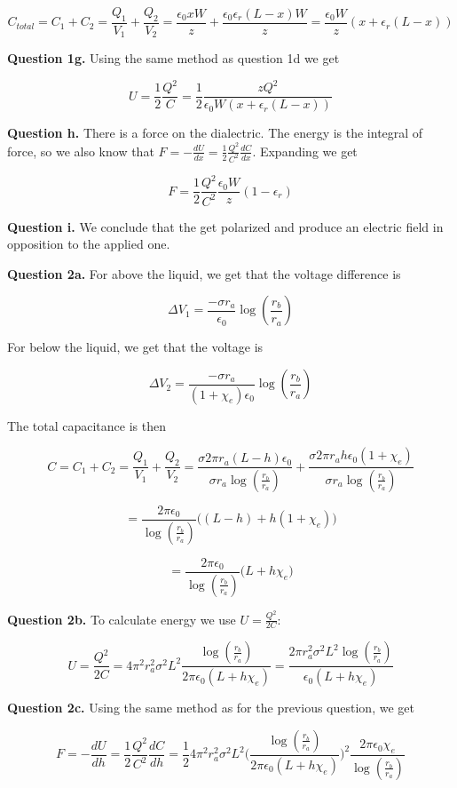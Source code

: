 \documentclass[letterpaper, reqno,11pt]{article}
\begin{document}
$$
    C_{total}=C_1+C_2=\frac{Q_1}{V_1}+\frac{Q_2}{V_2}=\frac{\epsilon_0xW}{z}+\frac{\epsilon_0\epsilon_r(L-x)W}z=\frac{\epsilon_0W}{z}(x+\epsilon_r(L-x))
$$

{\noindent\bf Question 1g.} Using the same method as question 1d we get 

$$
    U=\frac12\frac{Q^2}{C}=\frac12\frac{zQ^2}{\epsilon_0W(x+\epsilon_r(L-x))}
$$

{\noindent\bf Question h.} There is a force on the dialectric. The energy is the integral of force, so we also know that $F=-\frac{dU}{dx}=\frac12\frac{Q^2}{C^2}\frac{dC}{dx}$. Expanding we get 

$$
    F=\frac12\frac{Q^2}{C^2}\frac{\epsilon_0W}{z}(1-\epsilon_r)
$$

{\noindent\bf Question i.} We conclude that the get polarized and produce an electric field in opposition to the applied one. 

{\noindent\bf Question 2a.} For above the liquid, we get that the voltage difference is 

$$
    \Delta V_1=\frac{-\sigma r_a}{\epsilon_0}\log(\frac{r_b}{r_a})
$$

For below the liquid, we get that the voltage is 

$$
    \Delta V_2=\frac{-\sigma r_a}{(1+\chi_e)\epsilon_0}\log(\frac{r_b}{r_a})
$$

The total capacitance is then 

$$
    C=C_1+C_2=\frac{Q_1}{V_1}+\frac{Q_2}{V_2}=\frac{\sigma2\pi r_a(L-h)\epsilon_0}{\sigma r_a\log(\frac{r_b}{r_a})}+\frac{\sigma2\pi r_ah\epsilon_0(1+\chi_e)}{\sigma r_a\log(\frac{r_b}{r_a})}
$$

$$
    =\frac{2\pi\epsilon_0}{\log(\frac{r_b}{r_a})}\bigg((L-h)+h(1+\chi_e)\bigg)
$$

$$
    =\frac{2\pi\epsilon_0}{\log(\frac{r_b}{r_a})}\bigg(L+h\chi_e\bigg)
$$

{\noindent\bf Question 2b.} To calculate energy we use $U=\frac{Q^2}{2C}$: 

$$
    U=\frac{Q^2}{2C}=4\pi^2r_a^2\sigma^2L^2\frac{\log(\frac{r_b}{r_a})}{2\pi\epsilon_0(L+h\chi_e)}=\frac{2\pi r_a^2\sigma^2L^2\log(\frac{r_b}{r_a})}{\epsilon_0(L+h\chi_e)}
$$

{\noindent\bf Question 2c.} Using the same method as for the previous question, we get 

$$
    F=-\frac{dU}{dh}=\frac12\frac{Q^2}{C^2}\frac{dC}{dh}=\frac124\pi^2r_a^2\sigma^2L^2\bigg(\frac{\log(\frac{r_b}{r_a})}{2\pi\epsilon_0(L+h\chi_e)}\bigg)^2\frac{2\pi\epsilon_0\chi_e}{\log(\frac{r_b}{r_a})}
$$
\end{document}
